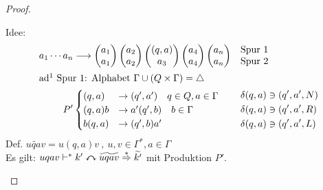 {\begin{proof}
\begin{itemize}
	Idee: 
	\begin{align*}
		a_1\cdots a_n &\-->
			\pmqty{a_1\\a_1} \pmqty{a_2\\a_2} \pmqty{(q,a)\\a_3} \pmqty{a_4\\a_4} \pmqty{a_n\\a_n}
			&&\begin{matrix}\text{Spur 1}\\\text{Spur 2}\end{matrix}\\
	\shortintertext{ad\footnotemark\ Spur 1: Alphabet $\Gamma\cup(Q\x\Gamma) = \triangle$}
		P' &\begin{cases}
			(q,a) &\-> (q',a')   \quad q\in Q,a\in\Gamma\\
			(q,a)b &\-> a'(q',b) \quad b\in\Gamma\\
			b(q,a) &\-> (q',b)a'
		\end{cases}
		& &\begin{aligned}
			\delta(q,a) &\ni (q',a',N)\\
			\delta(q,a) &\ni (q',a',R)\\
			\delta(q,a) &\ni (q',a',L)
		\end{aligned}
	\end{align*}%
	Def. $\widetilde{uqav} = u(q,a)v\ ,\ u,v\in\Gamma^*,a\in\Gamma$\\
	Es gilt: $uqav\vdash^* k' \curvearrowleftright \widetilde{uqav} \overset{*}{\=>} \widetilde{k'}$ mit Produktion $P'$.
	

\end{itemize}
\end{proof}}
